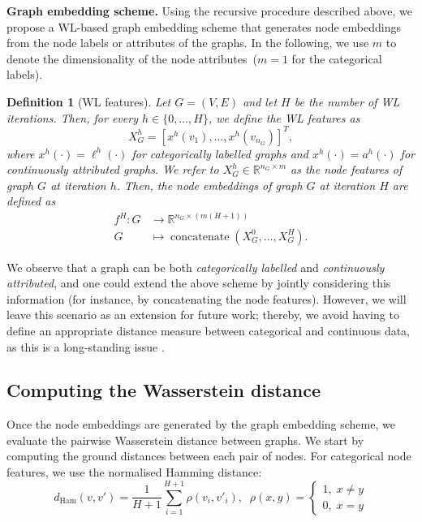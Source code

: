 \documentclass{article}
\DeclareMathOperator{\concatenate}{concatenate}
\newtheorem{definition}{Definition}
\begin{document}
\textbf{Graph embedding scheme.} Using the recursive procedure described above, we propose a WL-based graph embedding scheme that generates node embeddings from the node labels or attributes of the graphs. In the following, we use $m$ to denote the dimensionality of the node attributes~($m = 1$ for the categorical labels).

\begin{definition}[WL features]
\label{def:dwl_embedding}
Let $G = (V,E)$ and let $H$ be the number of WL iterations. Then, for every $h \in \{0,\ldots,H\}$, we define the WL features as 
\begin{equation}
 X^h_G = [x^h(v_1),\ldots,x^h(v_{n_G})]^{T},
\end{equation}
where $x^h(\cdot)=\ell^h(\cdot)$ for categorically labelled graphs and $x^h(\cdot)=a^h(\cdot)$ for continuously attributed graphs. We refer to $X^h_G\in \mathbb{R}^{n_{G}\times m}$ as the \emph{node features} of graph $G$ at iteration $h$. Then, the node embeddings of graph $G$ at iteration $H$ are defined as
\begin{equation}
\begin{split}\label{embed}
f^H\colon G &\to \mathbb{R}^{n_G\times (m(H+1))}\\
G &\mapsto \concatenate(X^0_G, \ldots, X^H_G).
\end{split}
\end{equation}

\end{definition}

We observe that a graph can be both \textit{categorically labelled} and \textit{continuously attributed}, and one could extend the above scheme by jointly considering this information (for instance, by concatenating the node features).
However, we will leave this scenario as an extension for future work; thereby, we avoid having to define an appropriate distance measure between categorical and continuous data, as this is a long-standing issue \citep{stevens1946theory}.




\subsection{Computing the Wasserstein distance}



Once the node embeddings are generated by the graph embedding scheme, we evaluate the pairwise Wasserstein distance between graphs. We start by computing the ground distances between each pair of nodes. For categorical node features, we use the normalised Hamming distance:
\begin{equation}
\label{eq:hammingdist}
d_{\text{Ham}}(v, v') = \frac{1}{H+1}\sum_{i=1}^{H+1} \rho (v_{i}, v'_{i}), \; \; 
\rho(x, y)=\left\{\begin{array}{l}
1, \; x \neq y
\\ 
0, \; x = y
\end{array}\right.
\end{equation}
\end{document}
